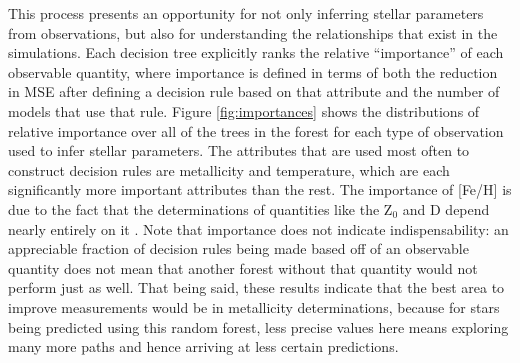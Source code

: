 \documentclass[twocolumn,twocolappendix]{aastex6}
\begin{document}
This process presents an opportunity for not only inferring stellar parameters from observations, but also for understanding the relationships that exist in the simulations. Each decision tree explicitly ranks the relative ``importance'' of each observable quantity, where importance is defined in terms of both the reduction in MSE after defining a decision rule based on that attribute and the number of models that use that rule. Figure \ref{fig:importances} shows the distributions of relative importance over all of the trees in the forest for each type of observation used to infer stellar parameters. The attributes that are used most often to construct decision rules are metallicity and temperature, which are each significantly more important attributes than the rest. The importance of [Fe/H] is due to the fact that the determinations of quantities like the Z$_0$ and D depend nearly entirely on it \citep[see also][]{main-sequence-stats}. %
Note that importance does not indicate indispensability: an appreciable fraction of decision rules being made based off of an observable quantity does not mean that another forest without that quantity would not perform just as well. That being said, these results indicate that the best area to improve measurements would be in metallicity determinations, because for stars being predicted using this random forest, less precise values here means exploring many more paths and hence arriving at less certain predictions. %
\end{document}
